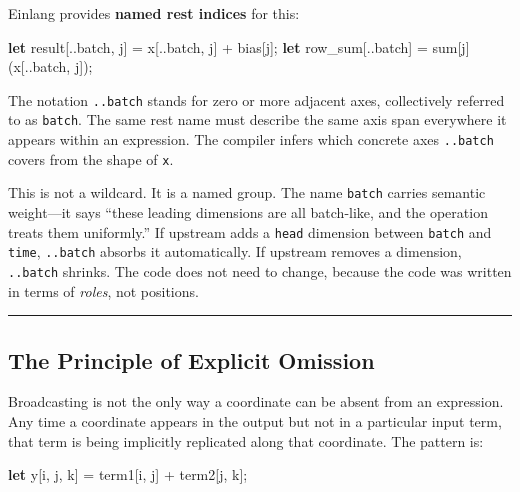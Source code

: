 \documentclass[11pt,]{article}
\newenvironment{Shaded}{}{}
\newcommand{\KeywordTok}[1]{\textcolor[rgb]{0.00,0.44,0.13}{\textbf{#1}}}
\newcommand{\NormalTok}[1]{#1}
\newcommand{\OperatorTok}[1]{\textcolor[rgb]{0.40,0.40,0.40}{#1}}
\begin{document}
Einlang provides \textbf{named rest indices} for this:

\begin{Shaded}
\begin{Highlighting}[]
\KeywordTok{let}\NormalTok{ result}\OperatorTok{[}\NormalTok{..batch, j}\OperatorTok{]}\NormalTok{ = x}\OperatorTok{[}\NormalTok{..batch, j}\OperatorTok{]}\NormalTok{ + bias}\OperatorTok{[}\NormalTok{j}\OperatorTok{]}\NormalTok{;}
\KeywordTok{let}\NormalTok{ row_sum}\OperatorTok{[}\NormalTok{..batch}\OperatorTok{]}\NormalTok{ = sum}\OperatorTok{[}\NormalTok{j}\OperatorTok{]}\NormalTok{(x}\OperatorTok{[}\NormalTok{..batch, j}\OperatorTok{]}\NormalTok{);}
\end{Highlighting}
\end{Shaded}

The notation \texttt{..batch} stands for zero or more adjacent axes,
collectively referred to as \texttt{batch}. The same rest name must
describe the same axis span everywhere it appears within an expression.
The compiler infers which concrete axes \texttt{..batch} covers from the
shape of \texttt{x}.

This is not a wildcard. It is a named group. The name \texttt{batch}
carries semantic weight---it says ``these leading dimensions are all
batch-like, and the operation treats them uniformly.'' If upstream adds
a \texttt{head} dimension between \texttt{batch} and \texttt{time},
\texttt{..batch} absorbs it automatically. If upstream removes a
dimension, \texttt{..batch} shrinks. The code does not need to change,
because the code was written in terms of \emph{roles}, not positions.

\begin{center}\rule{0.5\linewidth}{0.4pt}\end{center}

\hypertarget{the-principle-of-explicit-omission}{%
\subsection{The Principle of Explicit
Omission}\label{the-principle-of-explicit-omission}}

Broadcasting is not the only way a coordinate can be absent from an
expression. Any time a coordinate appears in the output but not in a
particular input term, that term is being implicitly replicated along
that coordinate. The pattern is:

\begin{Shaded}
\begin{Highlighting}[]
\KeywordTok{let}\NormalTok{ y}\OperatorTok{[}\NormalTok{i, j, k}\OperatorTok{]}\NormalTok{ = term1}\OperatorTok{[}\NormalTok{i, j}\OperatorTok{]}\NormalTok{ + term2}\OperatorTok{[}\NormalTok{j, k}\OperatorTok{]}\NormalTok{;}
\end{Highlighting}
\end{Shaded}
\end{document}
